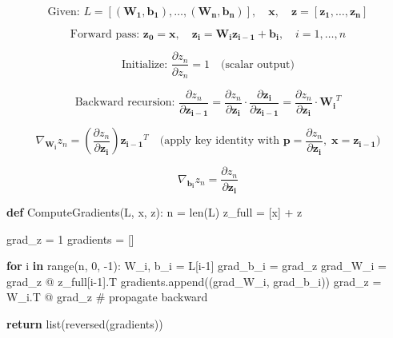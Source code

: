 \documentclass[
  letterpaper,
  DIV=11,
  numbers=noendperiod]{scrartcl}
\newenvironment{Shaded}{\begin{snugshade}}{\end{snugshade}}
\newcommand{\BuiltInTok}[1]{\textcolor[rgb]{0.00,0.23,0.31}{#1}}
\newcommand{\CommentTok}[1]{\textcolor[rgb]{0.37,0.37,0.37}{#1}}
\newcommand{\ControlFlowTok}[1]{\textcolor[rgb]{0.00,0.23,0.31}{\textbf{#1}}}
\newcommand{\DecValTok}[1]{\textcolor[rgb]{0.68,0.00,0.00}{#1}}
\newcommand{\KeywordTok}[1]{\textcolor[rgb]{0.00,0.23,0.31}{\textbf{#1}}}
\newcommand{\NormalTok}[1]{\textcolor[rgb]{0.00,0.23,0.31}{#1}}
\newcommand{\OperatorTok}[1]{\textcolor[rgb]{0.37,0.37,0.37}{#1}}
\begin{document}
\[\text{Given: } L = [(\mathbf{W_1}, \mathbf{b_1}), \ldots, (\mathbf{W_n}, \mathbf{b_n})], \quad \mathbf{x}, \quad \mathbf{z} = [\mathbf{z_1}, \ldots, \mathbf{z_n}]\]

\[\text{Forward pass: } \mathbf{z_0} = \mathbf{x}, \quad \mathbf{z_{i}} = \mathbf{W_i}\mathbf{z_{i-1}} + \mathbf{b_i}, \quad i = 1, \ldots, n\]

\[\text{Initialize: } \frac{\partial z_n}{\partial z_n} = 1 \quad \text{(scalar output)}\]

\[\text{Backward recursion: } \frac{\partial z_n}{\partial \mathbf{z_{i-1}}} = \frac{\partial z_n}{\partial \mathbf{z_i}} \cdot \frac{\partial \mathbf{z_i}}{\partial \mathbf{z_{i-1}}} = \frac{\partial z_n}{\partial \mathbf{z_i}} \cdot \mathbf{W_i}^T\]

\[\nabla_{\mathbf{W_i}} z_n = \left(\frac{\partial z_n}{\partial \mathbf{z_i}}\right) \mathbf{z_{i-1}}^T \quad \text{(apply key identity with } \mathbf{p} = \frac{\partial z_n}{\partial \mathbf{z_i}}, \; \mathbf{x} = \mathbf{z_{i-1}}\text{)}\]

\[\nabla_{\mathbf{b_i}} z_n = \frac{\partial z_n}{\partial \mathbf{z_i}}\]

\begin{Shaded}
\begin{Highlighting}[]
\KeywordTok{def}\NormalTok{ ComputeGradients(L, x, z):}
\NormalTok{    n }\OperatorTok{=} \BuiltInTok{len}\NormalTok{(L)}
\NormalTok{    z\_full }\OperatorTok{=}\NormalTok{ [x] }\OperatorTok{+}\NormalTok{ z}
    
\NormalTok{    grad\_z }\OperatorTok{=} \DecValTok{1}
\NormalTok{    gradients }\OperatorTok{=}\NormalTok{ []}
    
    \ControlFlowTok{for}\NormalTok{ i }\KeywordTok{in} \BuiltInTok{range}\NormalTok{(n, }\DecValTok{0}\NormalTok{, }\OperatorTok{{-}}\DecValTok{1}\NormalTok{):}
\NormalTok{        W\_i, b\_i }\OperatorTok{=}\NormalTok{ L[i}\OperatorTok{{-}}\DecValTok{1}\NormalTok{]}
\NormalTok{        grad\_b\_i }\OperatorTok{=}\NormalTok{ grad\_z}
\NormalTok{        grad\_W\_i }\OperatorTok{=}\NormalTok{ grad\_z }\OperatorTok{@}\NormalTok{ z\_full[i}\OperatorTok{{-}}\DecValTok{1}\NormalTok{].T}
\NormalTok{        gradients.append((grad\_W\_i, grad\_b\_i))}
\NormalTok{        grad\_z }\OperatorTok{=}\NormalTok{ W\_i.T }\OperatorTok{@}\NormalTok{ grad\_z  }\CommentTok{\# propagate backward}
    
    \ControlFlowTok{return} \BuiltInTok{list}\NormalTok{(}\BuiltInTok{reversed}\NormalTok{(gradients))}
\end{Highlighting}
\end{Shaded}
\end{document}
